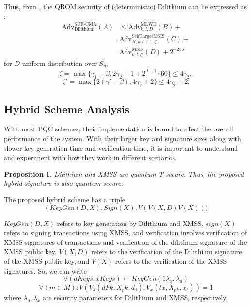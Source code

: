 \documentclass[5p,times]{elsarticle}
\newtheorem{prop}[thm]{Proposition}
\theoremstyle{definition}
\theoremstyle{remark}
\numberwithin{equation}{section}
\begin{document}
Thus, from \cite{kiltzConcreteTreatmentFiatShamir2017a},
the QROM security of (deterministic) Dilithium can be expressed as \cite{ducasCRYSTALSDilithiumLatticeBasedDigital2018}:
\begin{align*}
    \text{Adv}^{\text{SUF-CMA}}_{\text{Dilithium}}(A) 
    & \leq \text{Adv}^{\text{MLWE}}_{k, l ,D}(B) + \\
    & \text{Adv}^{\text{SelfTargetMSIS}}_{H,k,l+1,\zeta}(C) + \\
     & \text{Adv}^{\text{MSIS}}_{k, l ,\zeta'}(D) + 2^{-256}
\end{align*}
for $D$ uniform distribution over $S_\eta$,
$$\zeta = \max\{\gamma_1 - \beta, 2\gamma_2 + 1 + 
2^{d-1}\cdot 60\} \leq 4\gamma_2,$$
$$\zeta' = \max\{2(\gamma' - \beta), 4\gamma_2 + 2\} 
\leq 4\gamma_2 + 2.$$


\subsection{Hybrid Scheme Analysis} 
With most PQC schemes, their implementation is bound to affect
the overall performance of the system.
With their larger key and signature sizes along with slower
key generation time and verification time, it is important to
understand and experiment with how they work in different scenarios.

\begin{prop}
Dilithium and XMSS are quantum T-secure. Thus, the proposed hybrid signature is also quantum secure.
\end{prop}

The proposed hybrid scheme has a triple $$ \left (KeyGen (D, X), Sign (X), V (V (X, D) V (X)))\right.$$

$KeyGen(D,X)$ refers to key generation by Dilithium and XMSS, $sign(X)$ refers to signing transactions using XMSS, and verification involves verification of XMSS signatures of transactions and
verification of the dilithium signature of the XMSS public key.
$V(X,D)$ refers to the verification of the Dilithium signature of the XMSS public key, and
$V(X)$ refers to the verification of the XMSS signatures.
So, we can write
$$\forall (dKeys, xKeys) \leftarrow KeyGen (1{\lambda_x, \lambda_d})$$
$$\forall (m \in M): V(V_d(dPk, X_pk, d_\delta), V_x (tx, X_{pk}, x_\delta)) = 1$$ 
where $\lambda_d, \lambda_x$ are security parameters for Dilithium and XMSS, respectively.
\end{document}
